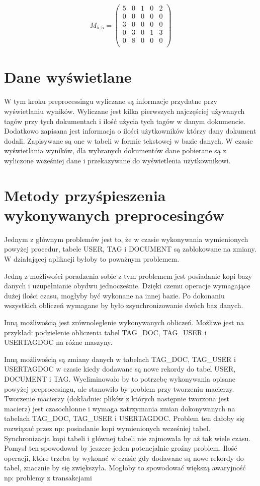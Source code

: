 \documentclass[11pt,a4paper]{report}
\begin{document}
\[
 M_{5,5} =
 \begin{pmatrix}
5 & 0 & 1 & 0 & 2\\
0 & 0 & 0 & 0 & 0\\
3 & 0 & 0 & 0 & 0\\
0 & 3 & 0 & 1 & 3\\
0 & 8 & 0 & 0 & 0\\

 \end{pmatrix}
\]


\section{Dane wyświetlane}
W tym kroku preprocessingu wyliczane są informacje przydatne przy wyświetlaniu wyników. Wyliczane jest kilka pierwszych najczęściej używanych tagów przy tych dokumentach i ilość użycia tych tagów w danym dokumencie. Dodatkowo zapisana jest informacja o ilości użytkowników którzy dany dokument dodali. Zapisywane są one w tabeli w formie tekstowej w bazie danych. W czasie wyświetlania wyników, dla wybranych dokumentów dane pobierane są z wyliczone wcześniej dane i przekazywane do wyświetlenia użytkownikowi. 


\section{Metody przyśpieszenia wykonywanych preprocesingów}

Jednym z głównym problemów jest to, że w czasie wykonywania wymienionych powyżej procedur, tabele USER, TAG i DOCUMENT są zablokowane na zmiany. W działającej aplikacji byłoby to poważnym problemem.  

Jedną z możliwości poradzenia sobie z tym problemem jest posiadanie kopi bazy danych i uzupełnianie obydwu jednocześnie. Dzięki czemu operacje wymagające dużej ilości czasu, mogłyby być wykonane na innej bazie. Po dokonaniu wszystkich obliczeń wymagane by było zsynchronizowanie dwóch baz danych.

Inną możliwością jest zrównoleglenie wykonywanych obliczeń. Możliwe jest na przykład: podzielenie obliczenia tabel TAG\_DOC, TAG\_USER i USERTAGDOC na różne maszyny. 

Inną możliwością są zmiany danych w tabelach TAG\_DOC, TAG\_USER i USERTAGDOC w czasie kiedy dodawane są nowe rekordy do tabel USER, DOCUMENT i TAG. Wyeliminowało by to potrzebę wykonywania opisane powyżej preprocesingu, ale stanowiło by problem przy tworzeniu macierzy. Tworzenie macierzy (dokładnie: plików z których następnie tworzona jest macierz) jest czasochłonne i wymaga zatrzymania zmian dokonywanych na tabelach TAG\_DOC, TAG\_USER i USERTAGDOC. Problem ten dałoby się rozwiązać przez np: posiadanie kopi wymienionych wcześniej tabel. Synchronizacja kopi tabeli i głównej tabeli nie zajmowała by aż tak wiele czasu. Pomysł ten spowodował by jeszcze jeden potencjalnie groźny problem. Ilość operacji, które trzeba by wykonać w czasie gdy dodawane są nowe rekordy do tabel, znacznie by się zwiększyła. Mogłoby to spowodować większą awaryjność np: problemy z transakcjami
\end{document}
